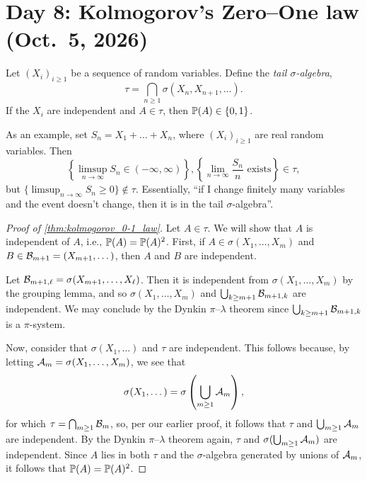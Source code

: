 \section{Day 8: Kolmogorov's Zero--One law (Oct.\ 5, 2026)}
\begin{theorem} \label{thm:kolmogorov_0-1_law}
    Let $(X_i)_{i \geq 1}$ be a sequence of random variables. Define the \textit{tail $\sigma$-algebra},
    \[ \tau = \bigcap_{n \geq 1} \sigma(X_n, X_{n+1}, \dots). \]
    If the $X_i$ are independent and $A \in \tau$, then $\mathbb P(A) \in \{0, 1\}$.
\end{theorem}

As an example, set $S_n = X_1 + \dots + X_n$, where $(X_i)_{i \geq 1}$ are real random variables. Then
\[ \left\{\limsup_{n \to \infty} S_n \in (-\infty, \infty)\right\}, \left\{\lim_{n \to \infty} \frac{S_n}{n} \text{ exists}\right\} \in \tau, \]
but $\{\limsup_{n \to \infty} S_n \geq 0\} \notin \tau$. Essentially, ``if I change finitely many variables and the event doesn't change, then it is in the tail $\sigma$-algebra''.

\begin{proof}[Proof of \ref{thm:kolmogorov_0-1_law}]
    Let $A \in \tau$. We will show that $A$ is independent of $A$, i.e., $\mathbb P(A) = \mathbb P(A)^2$. First, if $A \in \sigma(X_1, \dots, X_m)$ and $B \in \mathcal B_{m+1} = (X_{m+1}, \dots)$, then $A$ and $B$ are independent.
    \begin{subproof}
        Let $\mathcal B_{m+1,\ell} = \sigma(X_{m+1}, \dots, X_\ell)$. Then it is independent from $\sigma(X_1, \dots, X_m)$ by the grouping lemma, and so $\sigma(X_1, \dots, X_m)$ and $\bigcup_{k \geq m + 1} \mathcal B_{m+1, k}$ are independent. We may conclude by the Dynkin $\pi$--$\lambda$ theorem since $\bigcup_{k \geq m + 1} \mathcal B_{m+1,k}$ is a $\pi$-system.
    \end{subproof}

    Now, consider that $\sigma(X_1, \dots)$ and $\tau$ are independent. This follows because, by letting $\mathcal A_m = \sigma(X_1, \dots, X_m)$, we see that
    \[ \sigma(X_1, \dots) = \sigma\left(\bigcup_{m \geq 1} \mathcal A_m\right), \]
    for which $\tau = \bigcap_{m \geq 1} \mathcal B_m$, so, per our earlier proof, it follows that $\tau$ and $\bigcup_{m \geq 1} \mathcal A_m$ are independent. By the Dynkin $\pi$--$\lambda$ theorem again, $\tau$ and $\sigma(\bigcup_{m \geq 1} \mathcal A_m)$ are independent. Since $A$ lies in both $\tau$ and the $\sigma$-algebra generated by unions of $\mathcal A_m$, it follows that $\mathbb P(A) = \mathbb P(A)^2$.
\end{proof}


